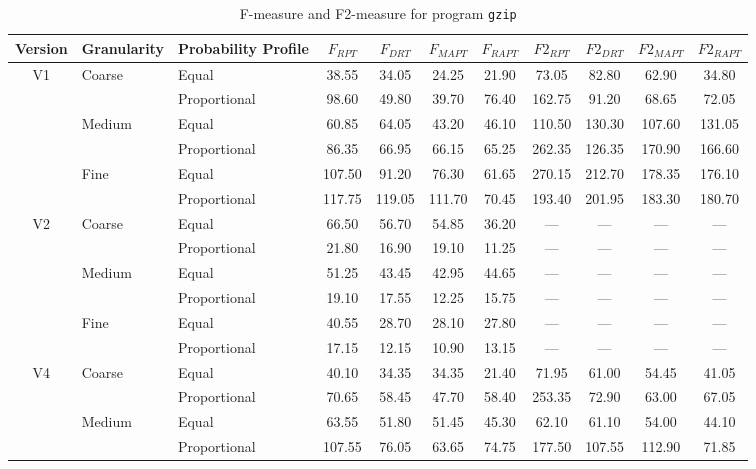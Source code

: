 \documentclass[10pt,journal,compsoc]{IEEEtran}
\begin{document}
\begin{table}
\caption{F-measure and F2-measure for program \texttt{gzip}}
\label{tab:Fgzip}
\centering
\begin{tabular}{|c|l|l|c|c|c|c|c|c|c|c|} \hline
Version	& Granularity	& Probability Profile	& $F_{RPT}$	& $F_{DRT}$	& $F_{MAPT}$	& $F_{RAPT}$	& $F2_{RPT}$	& $F2_{DRT}$	& $F2_{MAPT}$	 & $F2_{RAPT}$	\\ \hline
V1	& Coarse	& Equal	& 38.55	& 34.05	& 24.25	& 21.90	& 73.05	& 82.80	& 62.90	& 34.80	\\ \cline{3-11}
	& 	& Proportional	& 98.60	& 49.80	& 39.70	& 76.40	& 162.75	& 91.20	& 68.65	& 72.05	\\ \cline{2-11}
	& Medium	& Equal	& 60.85	& 64.05	& 43.20	& 46.10	& 110.50	& 130.30	& 107.60	& 131.05	\\ \cline{3-11}
	& 	& Proportional	& 86.35	& 66.95	& 66.15	& 65.25	& 262.35	& 126.35	& 170.90	& 166.60	\\ \cline{2-11}
	& Fine	& Equal	& 107.50	& 91.20	& 76.30	& 61.65	& 270.15	& 212.70	& 178.35	& 176.10	\\ \cline{3-11}
	& 	& Proportional	& 117.75	& 119.05	& 111.70	& 70.45	& 193.40	& 201.95	& 183.30	& 180.70	\\ \hline
V2	& Coarse	& Equal	& 66.50	& 56.70	& 54.85	& 36.20	& ---	& ---	& ---	& ---	\\ \cline{3-11}
	& 	& Proportional	& 21.80	& 16.90	& 19.10	& 11.25	& ---	& ---	& ---	& ---	\\ \cline{2-11}
	& Medium	& Equal	& 51.25	& 43.45	& 42.95	& 44.65	& ---	& ---	& ---	& ---	\\ \cline{3-11}
	& 	& Proportional	& 19.10	& 17.55	& 12.25	& 15.75	& ---	& ---	& ---	& ---	\\ \cline{2-11}
	& Fine	& Equal	& 40.55	& 28.70	& 28.10	& 27.80	& ---	& ---	& ---	& ---	\\ \cline{3-11}
	& 	& Proportional	& 17.15	& 12.15	& 10.90	& 13.15	& ---	& ---	& ---	& ---	\\ \hline
V4	& Coarse	& Equal	& 40.10	& 34.35	& 34.35	& 21.40	& 71.95	& 61.00	& 54.45	& 41.05	\\ \cline{3-11}
	& 	& Proportional	& 70.65	& 58.45	& 47.70	& 58.40	& 253.35	& 72.90	& 63.00	& 67.05	\\ \cline{2-11}
	& Medium	& Equal	& 63.55	& 51.80	& 51.45	& 45.30	& 62.10	& 61.10	& 54.00	& 44.10	\\ \cline{3-11}
	& 	& Proportional	& 107.55	& 76.05	& 63.65	& 74.75	& 177.50	& 107.55	& 112.90	& 71.85	\\ \cline{2-11}

\end{tabular}
\end{table}
\end{document}
